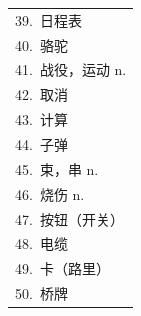 \documentclass[11pt,a4paper]{article}
\begin{document}
{\begin{tabular}{@{}p{16.4cm}@{}}
39.\ 日程表\dotfill \\
40.\ 骆驼\dotfill \\
41.\ 战役，运动 n.\dotfill \\
42.\ 取消\dotfill \\
43.\ 计算\dotfill \\
44.\ 子弹\dotfill \\
45.\ 束，串 n.\dotfill \\
46.\ 烧伤 n.\dotfill \\
47.\ 按钮（开关）\dotfill \\
48.\ 电缆\dotfill \\
49.\ 卡（路里）\dotfill \\
50.\ 桥牌\dotfill \\
\end{tabular}}

\vspace{0.3em}
\end{document}
